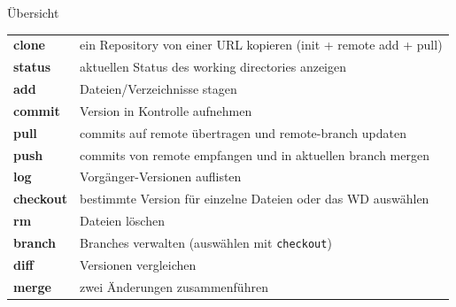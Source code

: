\documentclass[compress,t]{beamer}
\begin{document}
\begin{frame}{Übersicht}
    {\scriptsize
        \begin{tabular}{p{2.5cm}l}
            \textbf{clone}
                & ein Repository von einer URL kopieren (init + remote add + pull)\\
            \textbf{status}
                & aktuellen Status des working directories anzeigen\\
            \textbf{add}
                & Dateien/Verzeichnisse stagen\\
            \textbf{commit}
                & Version in Kontrolle aufnehmen\\
            \textbf{pull}
                & commits auf remote übertragen und remote-branch updaten\\
            \textbf{push}
                & commits von remote empfangen und in aktuellen branch mergen\\
            \textbf{log}
                & Vorgänger-Versionen auflisten\\
            \textbf{checkout}
                & bestimmte Version für einzelne Dateien oder
                das WD auswählen\\
            \textbf{rm}
                & Dateien löschen\\
            \textbf{branch}
                & Branches verwalten (auswählen mit \texttt{checkout})\\
            \textbf{diff}
                & Versionen vergleichen\\
            \textbf{merge}
                & zwei Änderungen zusammenführen\\
        \end{tabular}
    }
\end{frame}
\end{document}
